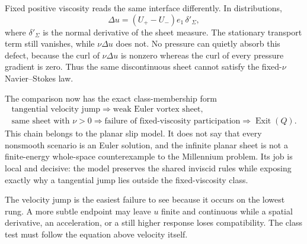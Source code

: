Fixed positive viscosity reads the same interface differently.
In distributions,
\[
  \Delta u
  =
  (U_+-U_-)e_1\,\delta'_\Sigma,
\]
where \(\delta'_\Sigma\) is the normal derivative of the sheet measure.
The stationary transport term still vanishes, while \(\nu\Delta u\) does not.
No pressure can quietly absorb this defect, because the curl of \(\nu\Delta u\) is nonzero whereas the curl of every pressure gradient is zero.
Thus the same discontinuous sheet cannot satisfy the fixed-\(\nu\) Navier--Stokes law.

The comparison now has the exact class-membership form
\[
  \begin{gathered}
  \text{tangential velocity jump}
  \Longrightarrow
  \text{weak Euler vortex sheet},\\
  \text{same sheet with }\nu>0
  \Longrightarrow
  \text{failure of fixed-viscosity participation}
  \Longrightarrow
  \operatorname{Exit}(Q).
  \end{gathered}
\]
This chain belongs to the planar slip model.
It does not say that every nonsmooth scenario is an Euler solution, and the infinite planar sheet is not a finite-energy whole-space counterexample to the Millennium problem.
Its job is local and decisive: the model preserves the shared inviscid rules while exposing exactly why a tangential jump lies outside the fixed-viscosity class.

The velocity jump is the easiest failure to see because it occurs on the lowest rung.
A more subtle endpoint may leave \(u\) finite and continuous while a spatial derivative, an acceleration, or a still higher response loses compatibility.
The class test must follow the equation above velocity itself.
